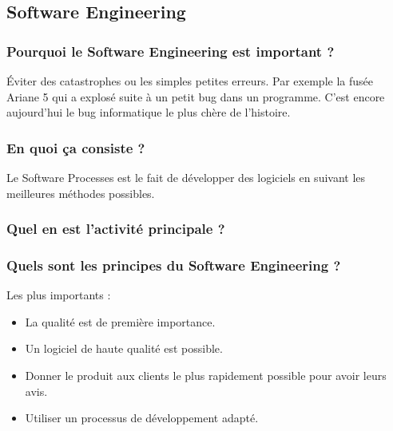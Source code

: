 \subsection{Software Engineering}



\subsubsection{Pourquoi le Software Engineering est important ?}
Éviter des catastrophes ou les simples petites erreurs. Par exemple la fusée Ariane 5 qui a explosé suite à un petit bug dans un programme. C'est encore aujourd'hui
le bug informatique le plus chère de l'histoire.



\subsubsection{En quoi ça consiste ?}
Le Software Processes est le fait de développer des logiciels en suivant les meilleures méthodes possibles.



\subsubsection{Quel en est l'activité principale ?}



\subsubsection{Quels sont les principes du Software Engineering ?}
Les plus importants :
\begin{itemize}
   \item La qualité est de première importance.
   \item Un logiciel de haute qualité est possible.
   \item Donner le produit aux clients le plus rapidement possible pour avoir leurs avis.
   \item Utiliser un processus de développement adapté.
\end{itemize}
